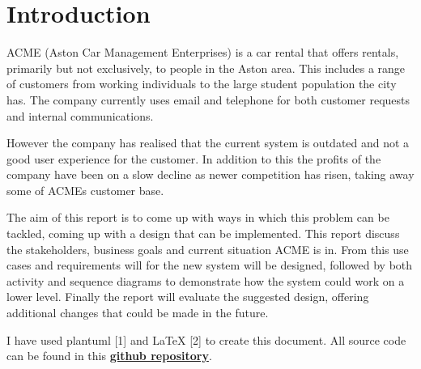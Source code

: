 \section{Introduction}
ACME (Aston Car Management Enterprises) is a car rental that offers rentals, primarily but not exclusively, to people in the Aston area.
This includes a range of customers from working individuals to the large student population the city has. The company currently uses email and telephone
for both customer requests and internal communications. 

However the company has realised that the current system is outdated and not a good user experience for the customer. In addition to this the 
profits of the company have been on a slow decline as newer competition has risen, taking away some of ACMEs customer base. 

The aim of this report is to come up with ways in which this problem can be tackled, coming up with a design that can be implemented. This report
discuss the stakeholders, business goals and current situation ACME is in. From this use cases and requirements will for the new system will be designed,
followed by both activity and sequence diagrams to demonstrate how the system could work on a lower level. Finally the report will evaluate the suggested
design, offering additional changes that could be made in the future.

\vspace{0.2cm}

I have used plantuml [1] and LaTeX [2] to create this document. All source code can be found in this
\href{https://github.com/OMBowkerBBC/DC4600-Assignment1}{\textbf{github repository}}.

\newpage
